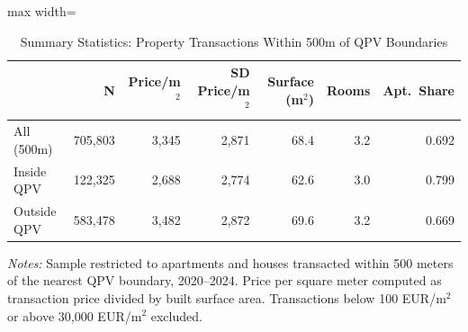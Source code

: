 \begin{table}[htbp]
\centering
\caption{Summary Statistics: Property Transactions Within 500m of QPV Boundaries}
\label{tab:summary}
\begin{threeparttable}
\begin{adjustbox}{max width=\textwidth}
\begin{tabular}{lrrrrrr}
\toprule
 & N & Price/m$^2$ & SD Price/m$^2$ & Surface (m$^2$) & Rooms & Apt.\ Share \\
\midrule
All (500m) & 705,803 & 3,345 & 2,871 & 68.4 & 3.2 & 0.692 \\
\midrule
Inside QPV & 122,325 & 2,688 & 2,774 & 62.6 & 3.0 & 0.799 \\
Outside QPV & 583,478 & 3,482 & 2,872 & 69.6 & 3.2 & 0.669 \\
\bottomrule
\end{tabular}
\end{adjustbox}
\begin{tablenotes}
\small
\item \textit{Notes:} Sample restricted to apartments and houses transacted within 500 meters of the nearest QPV boundary, 2020--2024. Price per square meter computed as transaction price divided by built surface area. Transactions below 100 EUR/m$^2$ or above 30,000 EUR/m$^2$ excluded.
\end{tablenotes}
\end{threeparttable}
\end{table}
